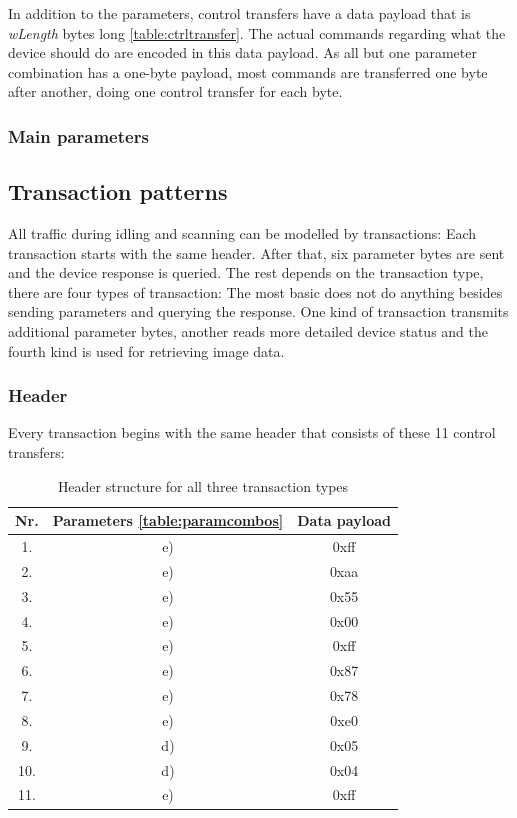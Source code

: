 \documentclass{article}
\begin{document}
In addition to the parameters, control transfers have a data payload that is {\it wLength} bytes long \autoref{table:ctrltransfer}.
The actual commands regarding what the device should do are encoded in this data payload.
As all but one parameter combination has a one-byte payload, most commands are transferred
one byte after another, doing one control transfer for each byte.

\subsubsection{Main parameters}
\label{ssec:image_param}

\subsection{Transaction patterns}

All traffic during idling and scanning can be modelled by transactions: Each transaction
starts with the same header. After that, six parameter bytes are sent and the
device response is queried. The rest depends on the transaction type, there
are four types of transaction: The most basic does not do anything besides sending parameters and querying the response.
One kind of transaction transmits additional parameter bytes, another reads more detailed device status
and the fourth kind is used for retrieving image data.

\subsubsection{Header}

Every transaction begins with the same header that consists of these 11 control transfers:

\begin{table}[H]
  \caption{Header structure for all three transaction types}
  \centering
  \begin{tabular}{c | c | c}
    Nr. & Parameters \autoref{table:paramcombos} & Data payload \\ \hline
    1. & e) & 0xff \\
    2. & e) & 0xaa \\
    3. & e) & 0x55 \\
    4. & e) & 0x00 \\
    5. & e) & 0xff \\
    6. & e) & 0x87 \\
    7. & e) & 0x78 \\
    8. & e) & 0xe0 \\
    9. & d) & 0x05 \\
    10. & d) & 0x04 \\
    11. & e) & 0xff \\
  \end{tabular}
  \label{table:transheader}
\end{table}
\end{document}
